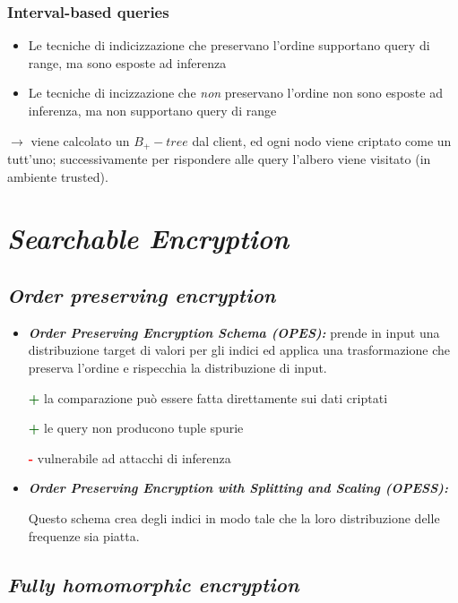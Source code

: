 \documentclass{report}
\begin{document}
\subsubsection{Interval-based queries}
\begin{itemize}
    \item Le tecniche di indicizzazione che preservano l'ordine supportano 
    query di range, ma sono esposte ad inferenza
    \item Le tecniche di incizzazione che \textit{non} preservano l'ordine non sono esposte 
    ad inferenza, ma non supportano query di range
\end{itemize}

$\rightarrow$ viene calcolato un $B_+ -tree$ dal client, ed ogni nodo viene criptato come un tutt'uno; successivamente 
per rispondere alle query l'albero viene visitato (in ambiente trusted).

\newpage
\section{\textit{Searchable Encryption}}
\subsection{\textit{Order preserving encryption}}
\begin{itemize}
    \item \textbf{\textit{Order Preserving Encryption Schema (OPES):}} prende in input una distribuzione target 
    di valori per gli indici ed applica una trasformazione che preserva l'ordine e rispecchia 
    la distribuzione di input.

    \textcolor{darkgreen}{\textbf{+}} la comparazione può essere fatta direttamente sui dati criptati 

    \textcolor{darkgreen}{\textbf{+}} le query non producono tuple spurie 

    \textcolor{red}{\textbf{-}} vulnerabile ad attacchi di inferenza

    \item \textbf{\textit{Order Preserving Encryption with Splitting and Scaling (OPESS):}}
    
    Questo schema crea degli indici in modo tale che la loro distribuzione delle frequenze sia piatta.
\end{itemize}

\subsection{\textit{Fully homomorphic encryption}}
\end{document}
